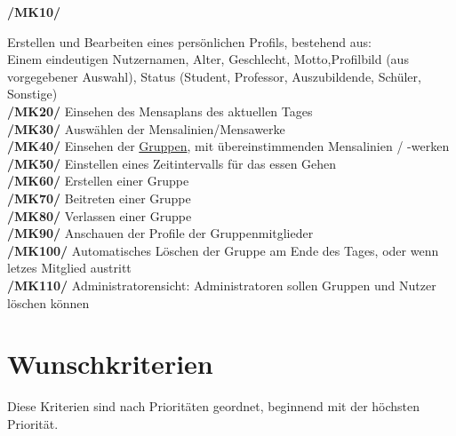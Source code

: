 \documentclass[a4paper]{scrreprt}
\begin{document}
\begin{addmargin}[25pt]{0pt} 
\hypertarget{mk10}{\textbf{/MK10/}} Erstellen und Bearbeiten eines persönlichen Profils, bestehend aus: \\ Einem eindeutigen Nutzernamen, Alter, Geschlecht, Motto,Profilbild (aus vorgegebener Auswahl), Status (Student, Professor, Auszubildende, Schüler, Sonstige)\\
\hypertarget{mk20}{\textbf{/MK20/}} Einsehen des Mensaplans des aktuellen Tages\\
\hypertarget{mk30}{\textbf{/MK30/}} Auswählen der Mensalinien/Mensawerke\\
\hypertarget{mk40}{\textbf{/MK40/}} Einsehen der \hyperlink{gruppe}{Gruppen}, mit übereinstimmenden Mensalinien / -werken\\
\hypertarget{mk50}{\textbf{/MK50/}} Einstellen eines Zeitintervalls für das essen Gehen \\
\hypertarget{mk60}{\textbf{/MK60/}} Erstellen einer Gruppe\\
\hypertarget{mk70}{\textbf{/MK70/}} Beitreten einer Gruppe\\
\hypertarget{mk80}{\textbf{/MK80/}} Verlassen einer Gruppe\\
\hypertarget{mk90}{\textbf{/MK90/}} Anschauen der Profile der Gruppenmitglieder\\
\hypertarget{mk100}{\textbf{/MK100/}} Automatisches Löschen der Gruppe am Ende des Tages, oder wenn letzes Mitglied austritt\\
\hypertarget{mk110}{\textbf{/MK110/}} Administratorensicht: Administratoren sollen Gruppen und Nutzer löschen können\\
\end{addmargin}

\section{Wunschkriterien}
Diese Kriterien sind nach Prioritäten geordnet, beginnend mit der höchsten Priorität.\\
\end{document}
